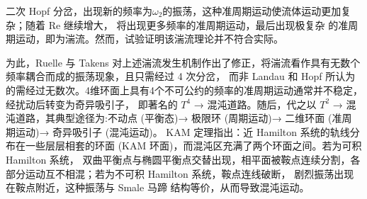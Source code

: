 二次 Hopf 分岔，出现新的频率为$\omega_2$的振荡，这种准周期运动使流体运动更加复杂；随着 Re 继续增大，
将出现更多频率的准周期运动，最后出现极复杂 的准周期运动，即为湍流。然而，试验证明该湍流理论并不符合实际。\par
为此，Ruelle 与 Takens 对上述湍流发生机制作出了修正，将湍流看作具有无数个频率耦合而成的振荡现象，且只需经过 4 次分岔，
而非 Landau 和 Hopf 所认为的需经过无数次。4维环面上具有4个不可公约的频率的准周期运动通常并不稳定，经扰动后转变为奇异吸引子，
即著名的 $T^4$ → 混沌道路。随后，代之以 $T^2$ → 混沌道路，其典型途径为:不动点 (平衡态)→ 极限环 (周期运动)→ 二维环面 (准周 期运动)→ 奇异吸引子 (混沌运动)。
KAM 定理指出：近 Hamilton 系统的轨线分布在一些层层相套的环面 (KAM 环面)，而混沌区充满了两个环面之间。若为可积 Hamilton 系统，
双曲平衡点与椭圆平衡点交替出现，相平面被鞍点连续分割，各部分运动互不相混；若为不可积 Hamilton 系统，鞍点连线破断，
剧烈振荡出现在鞍点附近，这种振荡与 Smale 马蹄 结构等价，从而导致混沌运动。
